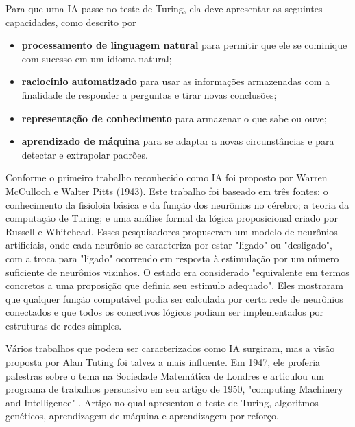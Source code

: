 \documentclass[
	12pt,				%
	openright,			%
	twoside,			%
	a4paper,			%
	english,			%
	french,				%
	spanish,			%
	brazil				%
	]{abntex2}
\begin{document}
Para que uma IA passe no teste de Turing, ela deve apresentar as seguintes capacidades, como descrito por 
\begin{itemize}
	\item \textbf{processamento de linguagem natural} para permitir que ele se cominique com sucesso em um idioma natural;
	\item \textbf{raciocínio automatizado} para usar as informações armazenadas com a finalidade de responder a perguntas e tirar novas conclusões;
	\item \textbf{representação de conhecimento} para armazenar o que sabe ou ouve;
	\item \textbf{aprendizado de máquina} para se adaptar a novas circunstâncias e para detectar e extrapolar padrões.
\end{itemize}
Conforme  o primeiro trabalho reconhecido como IA foi proposto por Warren McCulloch e Walter Pitts (1943). Este trabalho foi baseado em três fontes: o conhecimento da fisioloia básica e da função dos neurônios no cérebro; a teoria da computação de Turing; e uma análise formal da lógica proposicional criado por Russell e Whitehead. Esses pesquisadores propuseram um modelo de neurônios artificiais, onde cada neurônio se caracteriza por estar "ligado" ou "desligado", com a troca para "ligado" ocorrendo em resposta à estimulação por um número suficiente de neurônios vizinhos. O estado era considerado "equivalente em termos concretos a uma proposição que definia seu estimulo adequado". Eles mostraram que qualquer função computável podia ser calculada por certa rede de neurônios conectados e que todos os conectivos lógicos podiam ser implementados por estruturas de redes simples.

Vários trabalhos que podem ser caracterizados como IA surgiram, mas a visão proposta por Alan Tuting foi talvez a mais influente. Em 1947, ele proferia palestras sobre o tema na Sociedade Matemática de Londres e articulou um programa de trabalhos persuasivo em seu artigo de 1950, "computing Machinery and Intelligence" . Artigo no qual apresentou o teste de Turing, algoritmos genéticos, aprendizagem de máquina e aprendizagem por reforço.
\end{document}
